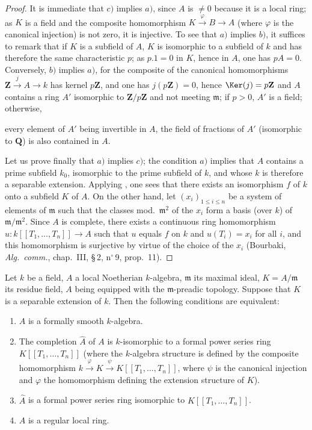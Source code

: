 \begin{proof}
It is immediate that $c)$ implies $a)$, since $A$ is $\neq 0$ because it is a local ring;
as $K$ is a field and the composite homomorphism $K\xrightarrow{\varphi}B\to A$ (where $\varphi$ is the canonical injection) is not zero, it is injective.
To see that $a)$ implies $b)$, it suffices to remark that if $K$ is a subfield of $A$, $K$ is isomorphic to a subfield of $k$ and has therefore the same characteristic $p$;
as $p.1=0$ in $K$, hence in $A$, one has $pA=0$.
Conversely, $b)$ implies $a)$, for the composite of the canonical homomorphisms $\mathbf{Z}\xrightarrow{j}A\to k$ has kernel $p\mathbf{Z}$, and one has $j(p\mathbf{Z})=0$, hence $\Ker(j)=p\mathbf{Z}$ and $A$ contains a ring $A'$ isomorphic to $\mathbf{Z}/p\mathbf{Z}$ and not meeting $\mathfrak{m}$;
if $p>0$, $A'$ is a field; otherwise,


every element of $A'$ being invertible in $A$, the field of fractions of $A'$ (isomorphic to $\mathbf{Q}$) is also contained in $A$.

Let us prove finally that $a)$ implies $c)$;
the condition $a)$ implies that $A$ contains a prime subfield $k_0$, isomorphic to the prime subfield of $k$, and whose $k$ is therefore a separable extension.
Applying , one sees that there exists an isomorphism $f$ of $k$ onto a subfield $K$ of $A$.
On the other hand, let $(x_i)_{1\leq i\leq n}$ be a system of elements of $\mathfrak{m}$ such that the classes mod.\ $\mathfrak{m}^2$ of the $x_i$ form a basis (over $k$) of $\mathfrak{m}/\mathfrak{m}^2$.
Since $A$ is complete, there exists a continuous ring homomorphism $u:k[[T_1,\ldots,T_n]]\to A$ such that $u$ equals $f$ on $k$ and $u(T_i)=x_i$ for all $i$, and this homomorphism is surjective by virtue of the choice of the $x_i$ (Bourbaki, \emph{Alg.\ comm.}, chap.~III, \S\,2, n$^\circ$\,9, prop.~11).
\end{proof}

\begin{theorem}[19.6.4]
\label{0.19.6.4}
Let $k$ be a field, $A$ a local Noetherian $k$-algebra, $\mathfrak{m}$ its maximal ideal, $K=A/\mathfrak{m}$ its residue field, $A$ being equipped with the $\mathfrak{m}$-preadic topology.
Suppose that $K$ is a separable extension of $k$.
Then the following conditions are equivalent:
\begin{enumerate}
  \item[a)] $A$ is a formally smooth $k$-algebra.
  \item[b)] The completion $\widehat{A}$ of $A$ is $k$-isomorphic to a formal power series ring $K[[T_1,\ldots,T_n]]$ (where the $k$-algebra structure is defined by the composite homomorphism $k\xrightarrow{\varphi}K\xrightarrow{\psi}K[[T_1,\ldots,T_n]]$, where $\psi$ is the canonical injection and $\varphi$ the homomorphism defining the extension structure of $K$).
  \item[b')] $\widehat{A}$ is a formal power series ring isomorphic to $K[[T_1,\ldots,T_n]]$.
  \item[c)] $A$ is a regular local ring.
\end{enumerate}
\end{theorem}

